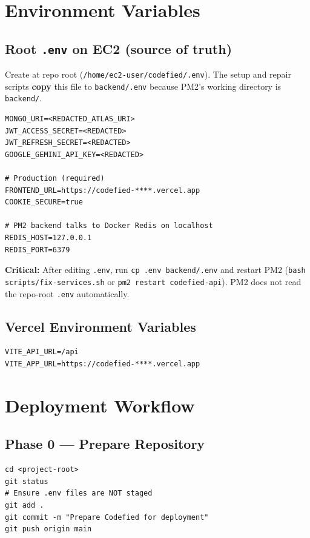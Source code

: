 \documentclass[11pt,a4paper]{article}
\begin{document}
\section{Environment Variables}

\subsection{Root \texttt{.env} on EC2 (source of truth)}
Create at repo root (\texttt{/home/ec2-user/codefied/.env}). The setup and repair scripts \textbf{copy} this file to \texttt{backend/.env} because PM2's working directory is \texttt{backend/}.

\begin{lstlisting}[style=envfile]
MONGO_URI=<REDACTED_ATLAS_URI>
JWT_ACCESS_SECRET=<REDACTED>
JWT_REFRESH_SECRET=<REDACTED>
GOOGLE_GEMINI_API_KEY=<REDACTED>

# Production (required)
FRONTEND_URL=https://codefied-****.vercel.app
COOKIE_SECURE=true

# PM2 backend talks to Docker Redis on localhost
REDIS_HOST=127.0.0.1
REDIS_PORT=6379
\end{lstlisting}

\textbf{Critical:} After editing \texttt{.env}, run \texttt{cp .env backend/.env} and restart PM2 (\texttt{bash scripts/fix-services.sh} or \texttt{pm2 restart codefied-api}). PM2 does not read the repo-root \texttt{.env} automatically.

\subsection{Vercel Environment Variables}
\begin{lstlisting}[style=envfile]
VITE_API_URL=/api
VITE_APP_URL=https://codefied-****.vercel.app
\end{lstlisting}

\section{Deployment Workflow}

\subsection{Phase 0 --- Prepare Repository}
\begin{lstlisting}[style=terminal]
cd <project-root>
git status
# Ensure .env files are NOT staged
git add .
git commit -m "Prepare Codefied for deployment"
git push origin main
\end{lstlisting}
\end{document}
